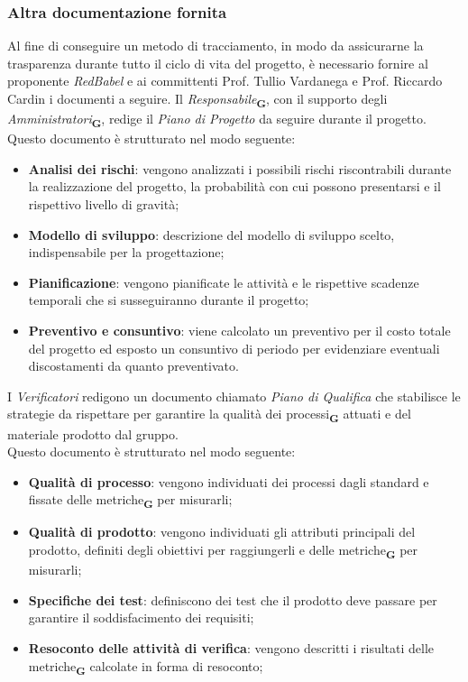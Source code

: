 \subsubsection{Altra documentazione fornita}
Al fine di conseguire un metodo di tracciamento, in modo da assicurarne la trasparenza durante tutto il ciclo di vita del progetto, è necessario fornire al proponente \textit{RedBabel} e ai committenti Prof. Tullio Vardanega e Prof. Riccardo Cardin i documenti a seguire.
Il \textit{Responsabile}\textsubscript{\textbf{G}}, con il supporto degli \textit{Amministratori}\textsubscript{\textbf{G}}, redige il \textit{Piano di Progetto} da seguire durante il progetto.
\\Questo documento è strutturato nel modo seguente:
\begin{itemize}
    \item \textbf{Analisi dei rischi}: vengono analizzati i possibili rischi riscontrabili durante la realizzazione del progetto, la probabilità con cui possono presentarsi e il rispettivo livello di gravità;
    \item \textbf{Modello di sviluppo}: descrizione del modello di sviluppo scelto, indispensabile per la progettazione;
    \item \textbf{Pianificazione}: vengono pianificate le attività e le rispettive scadenze temporali che si susseguiranno durante il progetto;
    \item \textbf{Preventivo e consuntivo}: viene calcolato un preventivo per il costo totale del progetto ed esposto un consuntivo di periodo per evidenziare eventuali discostamenti da quanto preventivato.
\end{itemize}
I \textit{Verificatori} redigono un documento chiamato \textit{Piano di Qualifica} che stabilisce le strategie da rispettare per garantire la qualità dei processi\textsubscript{\textbf{G}} attuati e del materiale prodotto dal gruppo.
\\Questo documento è strutturato nel modo seguente:
\begin{itemize}
    \item \textbf{Qualità di processo}: vengono individuati dei processi dagli standard e fissate delle metriche\textsubscript{\textbf{G}} per misurarli;
    \item \textbf{Qualità di prodotto}: vengono individuati gli attributi principali del prodotto, definiti degli obiettivi per raggiungerli e delle metriche\textsubscript{\textbf{G}} per misurarli;
    \item \textbf{Specifiche dei test}: definiscono dei test che il prodotto deve passare per garantire il soddisfacimento dei requisiti;
    \item \textbf{Resoconto delle attività di verifica}: vengono descritti i risultati delle metriche\textsubscript{\textbf{G}} calcolate in forma di resoconto;
\end{itemize}
